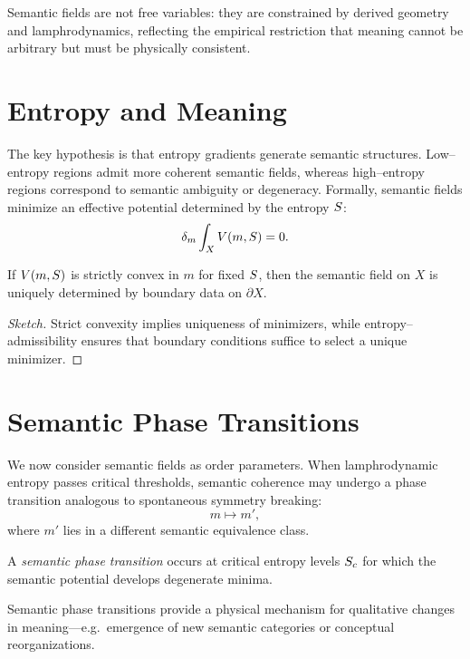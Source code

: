 \begin{remark}
Semantic fields are not free variables: they are constrained by
derived geometry and lamphrodynamics, reflecting the empirical
restriction that meaning cannot be arbitrary but must be physically
consistent.
\end{remark}


\section{Entropy and Meaning}

The key hypothesis is that entropy gradients generate semantic
structures. Low–entropy regions admit more coherent semantic fields,
whereas high–entropy regions correspond to semantic ambiguity or
degeneracy. Formally, semantic fields minimize an effective potential
determined by the entropy $S$:
\[
  \delta_m \int_X V(m,S) = 0.
\]

\begin{proposition}
If $V(m,S)$ is strictly convex in $m$ for fixed $S$, then
the semantic field on $X$ is uniquely determined by boundary data on
$\partial X$.
\end{proposition}

\begin{proof}[Sketch]
Strict convexity implies uniqueness of minimizers, while
entropy–admissibility ensures that boundary conditions suffice to select
a unique minimizer.
\end{proof}


\section{Semantic Phase Transitions}

We now consider semantic fields as order parameters. When lamphrodynamic
entropy passes critical thresholds, semantic coherence may undergo a
phase transition analogous to spontaneous symmetry breaking:
\[
  m \mapsto m',
\]
where $m'$ lies in a different semantic equivalence class.

\begin{definition}
A \emph{semantic phase transition} occurs at critical entropy levels
$S_c$ for which the semantic potential develops degenerate minima.
\end{definition}

\begin{remark}
Semantic phase transitions provide a physical mechanism for qualitative
changes in meaning---e.g.\ emergence of new semantic categories or
conceptual reorganizations.
\end{remark}


